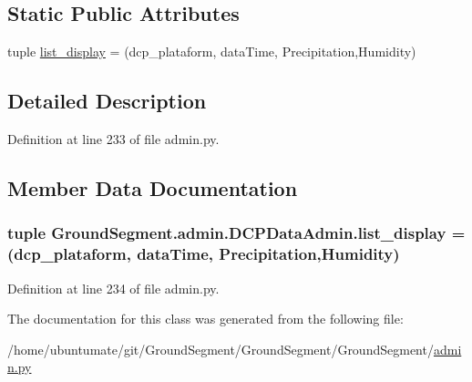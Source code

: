 \subsection*{Static Public Attributes}
\begin{DoxyCompactItemize}
\item 
tuple \hyperlink{class_ground_segment_1_1admin_1_1_d_c_p_data_admin_a3f1f119550a19ed0987c8f85bbc72471}{list\+\_\+display} = (\textquotesingle{}dcp\+\_\+plataform\textquotesingle{}, \textquotesingle{}data\+Time\textquotesingle{}, \textquotesingle{}Precipitation\textquotesingle{},\textquotesingle{}Humidity\textquotesingle{})
\end{DoxyCompactItemize}


\subsection{Detailed Description}


Definition at line 233 of file admin.\+py.



\subsection{Member Data Documentation}
\hypertarget{class_ground_segment_1_1admin_1_1_d_c_p_data_admin_a3f1f119550a19ed0987c8f85bbc72471}{}
\subsubsection[{list\+\_\+display}]{\setlength{\rightskip}{0pt plus 5cm}tuple Ground\+Segment.\+admin.\+D\+C\+P\+Data\+Admin.\+list\+\_\+display = (\textquotesingle{}dcp\+\_\+plataform\textquotesingle{}, \textquotesingle{}data\+Time\textquotesingle{}, \textquotesingle{}Precipitation\textquotesingle{},\textquotesingle{}Humidity\textquotesingle{})\hspace{0.3cm}{\ttfamily [static]}}\label{class_ground_segment_1_1admin_1_1_d_c_p_data_admin_a3f1f119550a19ed0987c8f85bbc72471}


Definition at line 234 of file admin.\+py.



The documentation for this class was generated from the following file\+:\begin{DoxyCompactItemize}
\item 
/home/ubuntumate/git/\+Ground\+Segment/\+Ground\+Segment/\+Ground\+Segment/\hyperlink{admin_8py}{admin.\+py}\end{DoxyCompactItemize}
